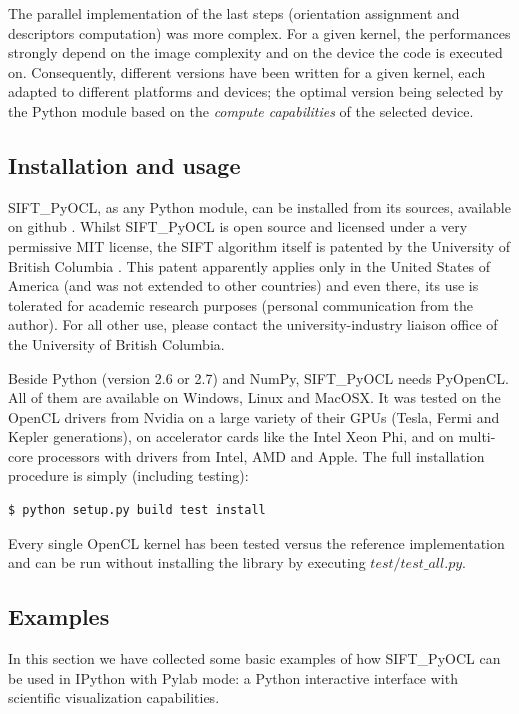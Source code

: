\documentclass[preprint]{iucr}
\begin{document}
The parallel implementation of the last steps (orientation assignment and
descriptors computation) was more complex.
For a given kernel, the performances strongly depend on the image
complexity and on the device the code is executed on.
Consequently, different versions have been written for a given kernel, each
adapted to different platforms and
devices; the optimal version being selected by the
Python module based on the \emph{compute capabilities} of the selected device.


\subsection{Installation and usage}
SIFT\_PyOCL, as any Python module, can be installed from its sources,
available on github \cite{sift_pyocl}.
Whilst SIFT\_PyOCL is open source and licensed under a very
permissive MIT license, the SIFT algorithm itself is
patented by the University of British Columbia \cite{SIFT_pat}.
This patent apparently applies only in the United States of America
(and was not extended to other countries) and even there, its use is
tolerated for academic research purposes (personal communication from the
author). For all other use, please contact the university-industry liaison
office of the University of British Columbia.

Beside Python (version 2.6 or 2.7) and NumPy, SIFT\_PyOCL needs
PyOpenCL. All of them are available on Windows, Linux and MacOSX.
It was tested on the OpenCL drivers from Nvidia on a
large variety of their GPUs (Tesla, Fermi and Kepler generations), on
accelerator cards like the Intel Xeon Phi,  and on multi-core processors with
drivers from Intel, AMD and Apple.
The full installation procedure is simply (including testing):
\begin{verbatim}
$ python setup.py build test install
\end{verbatim}
Every single OpenCL kernel has been tested versus the reference
implementation and can be run without installing the library by
executing $test/test\_all.py$.

\subsection{Examples}

In this section we have collected some basic examples of how
SIFT\_PyOCL can be used in IPython \cite{ipython} with Pylab \cite{matplotlib}
mode: a Python interactive interface with scientific visualization
capabilities.
\end{document}
